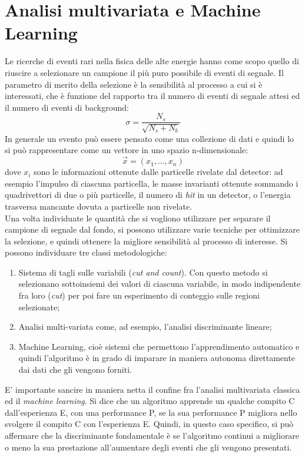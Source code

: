 \section{Analisi multivariata e Machine Learning}
\label{analisi multivariata e ML}

Le ricerche di eventi rari nella fisica delle alte energie hanno come scopo quello di riuscire a selezionare un campione il più puro possibile di eventi di segnale. Il parametro di merito della selezione è la sensibilità al processo a cui si è interessati, che è funzione del rapporto tra il numero di eventi di segnale attesi ed il numero di eventi di background: 
\begin{equation}
	\sigma = \frac{N_s}{\sqrt{N_s + N_b}}
\end{equation}
In generale un evento può essere pensato come una collezione di dati e quindi lo si può rappresentare come un vettore in uno spazio n-dimensionale: 
\begin{equation}
\vec{x} = (x_{1},...,x_{n})
\end{equation}
dove $x_i$ sono le informazioni ottenute dalle particelle rivelate dal detector: ad esempio l'impulso di ciascuna particella, le masse invarianti ottenute sommando i quadrivettori di due o più particelle, il numero di \textit{hit} in un detector, o l'energia trasversa mancante dovuta a particelle non rivelate. \\
Una volta individuate le quantità che si vogliono utilizzare per separare il campione di segnale dal fondo, si possono utilizzare varie tecniche per ottimizzare la selezione, e quindi ottenere la migliore sensibilità al processo di interesse. Si possono individuare tre classi metodologiche:

\begin{enumerate}
	\item Sistema di tagli sulle variabili (\textit{cut and count}). Con questo metodo si selezionano sottoinsiemi dei valori di ciascuna variabile, in modo indipendente fra loro (\textit{cut}) per poi fare un esperimento di conteggio sulle regioni selezionate;
	\item Analisi multi-variata come, ad esempio, l'analisi discriminante lineare;
	\item Machine Learning, cioè sistemi che permettono l'apprendimento automatico e quindi l'algoritmo è in grado di imparare in maniera autonoma direttamente dai dati che gli vengono forniti.
\end{enumerate}
E' importante sancire in maniera netta il confine fra l'analisi multivariata classica ed il \textit{machine learning}. Si dice che un algoritmo apprende un qualche compito C dall'esperienza E, con una performance P, se la sua performance P migliora nello svolgere il compito C con l'esperienza E. Quindi, in questo caso specifico, si può affermare che la discriminante fondamentale è se l'algoritmo continui a migliorare o meno la sua prestazione all'aumentare degli eventi che gli vengono presentati.

